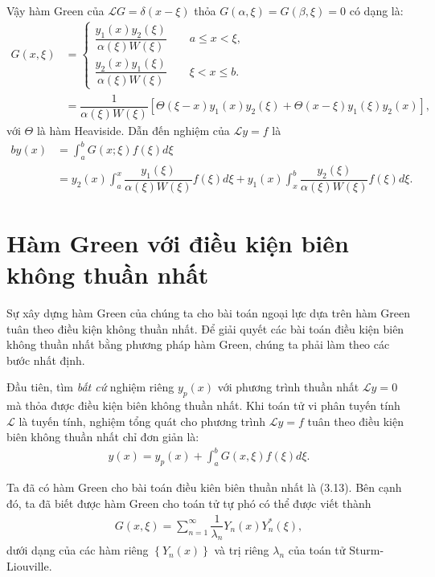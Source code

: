 \documentclass{report}
\newcommand{\f}[2]{\dfrac{#1}{#2}}
\begin{document}
Vậy hàm Green của $\mathcal{L} G = \delta (x-\xi)$ thỏa $G(\alpha,\xi) = G(\beta,\xi) = 0$ có dạng là:
\begin{align}
	G(x,\xi)
	 & =
	\begin{cases}
		\f{y_{1}(x)y_{2}(\xi)}{\alpha(\xi)W(\xi)} \quad\quad a \leq x < \xi , \\
		\f{y_{2}(x)y_{1}(\xi)}{\alpha(\xi)W(\xi)} \quad\quad \xi < x \leq b.
	\end{cases} \\
	 & = \f{1}{\alpha(\xi) W(\xi)} \left[ \Theta(\xi - x)y_{1}(x)y_{2}(\xi) + \Theta(x-\xi)y_{1}(\xi)y_{2}(x) \right],
\end{align}
với $\Theta$ là hàm Heaviside. Dẫn đến nghiệm của $\mathcal{L} y = f$ là
\begin{align}b
	y(x)
	 & = \int_{a}^{b} G(x;\xi) f(\xi) d \xi \nonumber                                                                                               \\
	 & = y_{2}(x) \int_{a}^{x} \f{y_{1}(\xi)}{\alpha(\xi) W(\xi)} f(\xi) d\xi + y_{1}(x) \int_{x}^{b} \f{y_{2}(\xi)}{\alpha(\xi)W(\xi)}f(\xi) d\xi.
\end{align}
\section{Hàm Green với điều kiện biên không thuần nhất}
Sự xây dựng hàm Green của chúng ta cho bài toán ngoại lực dựa trên hàm Green tuân theo điều kiện không thuần nhất. Để giải quyết các bài toán điều kiện biên không thuần nhất bằng phương pháp hàm Green, chúng ta phải làm theo các bước nhất định.

Đầu tiên, tìm \textit{bất cứ} nghiệm riêng $y_{p}(x)$ với phương trình thuần nhất $\mathcal{L}y = 0$ mà thỏa được điều kiện biên không thuần nhất. Khi toán tử vi phân tuyến tính $\mathcal{L}$ là tuyến tính, nghiệm tổng quát cho phương trình $\mathcal{L} y = f$ tuân theo điều kiện biên không thuần nhất chỉ đơn giản là:
\begin{align}
	y(x) = y_p(x) + \int_{a}^{b} G(x,\xi) f(\xi) d\xi.
\end{align}

Ta đã có hàm Green cho bài toán điều kiên biên thuần nhất là (3.13). Bên cạnh đó, ta đã biết được hàm Green cho toán tử tự phó có thể được viết thành
\begin{align}
	G(x,\xi) = \sum_{n = 1}^{\infty} \f{1}{\lambda_n} Y_n(x)Y_n^{*}(\xi),
\end{align}
dưới dạng của các hàm riêng $\left\{ Y_n(x) \right\}$ và trị riêng {$\lambda_n$} của toán tử Sturm-Liouville.
\end{document}
